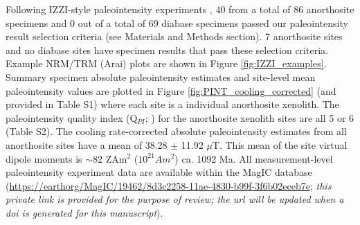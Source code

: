\documentclass[9pt,twocolumn,twoside,lineno]{pnas-new}
\begin{document}
Following IZZI-style paleointensity experiments \cite{Yu2004a}, 40 from a total of 86 anorthosite specimens and 0 out of a total of 69 diabase specimens passed our paleointensity result selection criteria (see Materials and Methods section). 7 anorthosite sites and no diabase sites have specimen results that pass these selection criteria. Example NRM/TRM (Arai) plots are shown in Figure \ref{fig:IZZI_examples}. Summary specimen absolute paleointensity estimates and site-level mean paleointensity values are plotted in Figure \ref{fig:PINT_cooling_corrected} (and provided in Table S1) where each site is a individual anorthosite xenolith. The paleointensity quality index (Q$_{PI}$; \citealp{Biggin2014a}) for the anorthosite xenolith sites are all 5 or 6 (Table S2). The cooling rate-corrected absolute paleointensity estimates from all anorthosite sites have a mean of 38.28 $\pm$ 11.92 $\mu$T. This mean of the site virtual dipole moments is $\sim$82 ZAm$^2$ ($10^{21} Am^2$) ca. 1092 Ma. All measurement-level paleointensity experiment data are available within the MagIC database (\url{https://earthorg/MagIC/19462/8d3c2258-11ae-4830-b99f-3f6b02eceb7e}; \textit{this private link is provided for the purpose of review; the url will be updated when a doi is generated for this manuscript}). 
\end{document}

